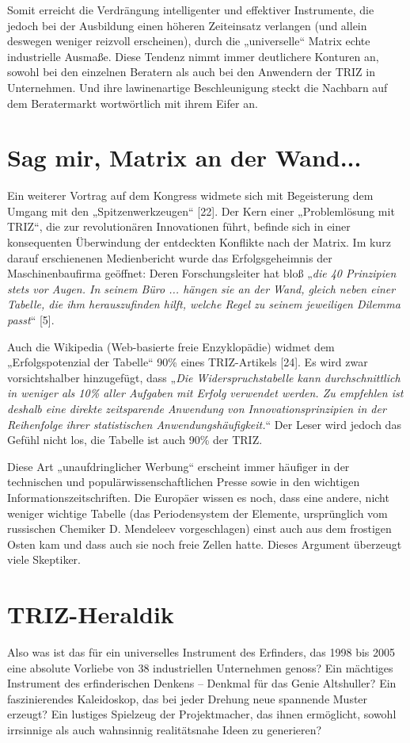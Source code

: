 \documentclass[11pt,a4paper]{article}
\begin{document}
Somit erreicht die Verdrängung intelligenter und effektiver Instrumente, die
jedoch bei der Ausbildung einen höheren Zeiteinsatz verlangen (und allein
deswegen weniger reizvoll erscheinen), durch die „universelle“ Matrix echte
industrielle Ausmaße. Diese Tendenz nimmt immer deutlichere Konturen an,
sowohl bei den einzelnen Beratern als auch bei den Anwendern der TRIZ in
Unternehmen. Und ihre lawinenartige Beschleunigung steckt die Nachbarn auf dem
Beratermarkt wortwörtlich mit ihrem Eifer an.

\section*{Sag mir, Matrix an der Wand...}
Ein weiterer Vortrag auf dem Kongress widmete sich mit Begeisterung dem Umgang
mit den „Spitzenwerkzeugen“ [22]. Der Kern einer „Problemlösung mit TRIZ“, die
zur revolutionären Innovationen führt, befinde sich in einer konsequenten
Überwindung der entdeckten Konflikte nach der Matrix. Im kurz darauf
erschienenen Medienbericht wurde das Erfolgsgeheimnis der Maschinenbaufirma
geöffnet: Deren Forschungsleiter hat bloß „\emph{die 40 Prinzipien stets vor
  Augen. In seinem Büro ... hängen sie an der Wand, gleich neben einer
  Tabelle, die ihm herauszufinden hilft, welche Regel zu seinem jeweiligen
  Dilemma passt}“ [5].

Auch die Wikipedia (Web-basierte freie Enzyklopädie) widmet dem
„Erfolgspotenzial der Tabelle“ 90\% eines TRIZ-Artikels [24]. Es wird zwar
vorsichtshalber hinzugefügt, dass „\emph{Die Widerspruchstabelle kann
  durchschnittlich in weniger als 10\% aller Aufgaben mit Erfolg verwendet
  werden. Zu empfehlen ist deshalb eine direkte zeitsparende Anwendung von
  Innovationsprinzipien in der Reihenfolge ihrer statistischen
  Anwendungshäufigkeit.}“ Der Leser wird jedoch das Gefühl nicht los, die
Tabelle ist auch 90\% der TRIZ.

Diese Art „unaufdringlicher Werbung“ erscheint immer häufiger in der
technischen und populärwissenschaftlichen Presse sowie in den wichtigen
Informationszeitschriften. Die Europäer wissen es noch, dass eine andere,
nicht weniger wichtige Tabelle (das Periodensystem der Elemente, ursprünglich
vom russischen Chemiker D. Mendeleev vorgeschlagen) einst auch aus dem
frostigen Osten kam und dass auch sie noch freie Zellen hatte. Dieses Argument
überzeugt viele Skeptiker.

\section*{TRIZ-Heraldik}
Also was ist das für ein universelles Instrument des Erfinders, das 1998 bis
2005 eine absolute Vorliebe von 38 industriellen Unternehmen genoss? Ein
mächtiges Instrument des erfinderischen Denkens – Denkmal für das Genie
Altshuller? Ein faszinierendes Kaleidoskop, das bei jeder Drehung neue
spannende Muster erzeugt? Ein lustiges Spielzeug der Projektmacher, das ihnen
ermöglicht, sowohl irrsinnige als auch wahnsinnig realitätsnahe Ideen zu
generieren?
\end{document}
